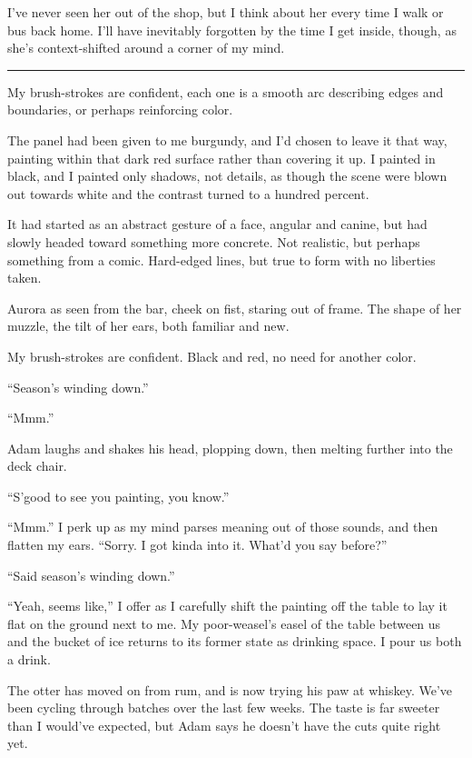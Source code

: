 I've never seen her out of the shop, but I think about her every time I walk or bus back home. I'll have inevitably forgotten by the time I get inside, though, as she's context-shifted around a corner of my mind.

\begin{center}\rule{0.5\linewidth}{\linethickness}\end{center}

My brush-strokes are confident, each one is a smooth arc describing edges and boundaries, or perhaps reinforcing color.

The panel had been given to me burgundy, and I'd chosen to leave it that way, painting within that dark red surface rather than covering it up. I painted in black, and I painted only shadows, not details, as though the scene were blown out towards white and the contrast turned to a hundred percent.

It had started as an abstract gesture of a face, angular and canine, but had slowly headed toward something more concrete. Not realistic, but perhaps something from a comic. Hard-edged lines, but true to form with no liberties taken.

Aurora as seen from the bar, cheek on fist, staring out of frame. The shape of her muzzle, the tilt of her ears, both familiar and new.

My brush-strokes are confident. Black and red, no need for another color.

``Season's winding down.''

``Mmm.''

Adam laughs and shakes his head, plopping down, then melting further into the deck chair.

``S'good to see you painting, you know.''

``Mmm.'' I perk up as my mind parses meaning out of those sounds, and then flatten my ears. ``Sorry. I got kinda into it. What'd you say before?''

``Said season's winding down.''

``Yeah, seems like,'' I offer as I carefully shift the painting off the table to lay it flat on the ground next to me. My poor-weasel's easel of the table between us and the bucket of ice returns to its former state as drinking space. I pour us both a drink.

The otter has moved on from rum, and is now trying his paw at whiskey. We've been cycling through batches over the last few weeks. The taste is far sweeter than I would've expected, but Adam says he doesn't have the cuts quite right yet.

